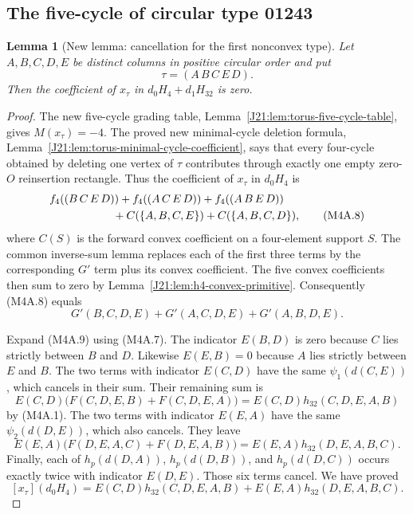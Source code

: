 \documentclass[11pt,oneside]{report}
\newtheorem{lemma}[theorem]{Lemma}
\theoremstyle{definition}
\numberwithin{equation}{section}
\begin{document}
\subsection{The five-cycle of circular type 01243}

\begin{lemma}[New lemma: cancellation for the first nonconvex type]
\label{J21:lem:h4-h32-A-cancellation}
Let $A,B,C,D,E$ be distinct columns in positive circular order and
put
\[
                         \tau=(A\,B\,C\,E\,D).
\]
Then the coefficient of $x_\tau$ in $d_0H_4+d_1H_{32}$ is zero.
\end{lemma}
\begin{proof}
The new five-cycle grading table,
Lemma~\ref{J21:lem:torus-five-cycle-table}, gives $M(x_\tau)=-4$.
The proved new minimal-cycle deletion formula,
Lemma~\ref{J21:lem:torus-minimal-cycle-coefficient}, says that every
four-cycle obtained by deleting one vertex of $\tau$ contributes
through exactly one empty zero-$O$ reinsertion rectangle.
Thus the coefficient of $x_\tau$ in $d_0H_4$ is
\begin{align*}
 &f_4((B\,C\,E\,D))+f_4((A\,C\,E\,D))
       +f_4((A\,B\,E\,D))\\
 &\hspace{20mm}
       +C(\{A,B,C,E\})+C(\{A,B,C,D\}),
 \tag{M4A.8}
\end{align*}
where $C(S)$ is the forward convex coefficient on a four-element
support $S$.
The common inverse-sum lemma replaces each of the first three terms
by the corresponding $G'$ term plus its convex coefficient.
The five convex coefficients then sum to zero by
Lemma~\ref{J21:lem:h4-convex-primitive}.
Consequently (M4A.8) equals
\[
                  G'(B,C,D,E)+G'(A,C,D,E)+G'(A,B,D,E).
 \tag{M4A.9}
\]

Expand (M4A.9) using (M4A.7).
The indicator $E(B,D)$ is zero because $C$ lies strictly between
$B$ and $D$.
Likewise $E(E,B)=0$ because $A$ lies strictly between $E$ and $B$.
The two terms with indicator $E(C,D)$ have the same
$\psi_1(d(C,E))$, which cancels in their sum.
Their remaining sum is
\[
 E(C,D)\bigl(F(C,D,E,B)+F(C,D,E,A)\bigr)
                 =E(C,D)h_{32}(C,D,E,A,B)
\]
by (M4A.1).
The two terms with indicator $E(E,A)$ have the same
$\psi_2(d(D,E))$, which also cancels.
They leave
\[
 E(E,A)\bigl(F(D,E,A,C)+F(D,E,A,B)\bigr)
                 =E(E,A)h_{32}(D,E,A,B,C).
\]
Finally, each of $h_p(d(D,A))$, $h_p(d(D,B))$, and
$h_p(d(D,C))$ occurs exactly twice with indicator $E(D,E)$.
Those six terms cancel.
We have proved
\[
 [x_\tau](d_0H_4)
   =E(C,D)h_{32}(C,D,E,A,B)
       +E(E,A)h_{32}(D,E,A,B,C).
 \tag{M4A.10}
\]


\end{proof}
\end{document}

